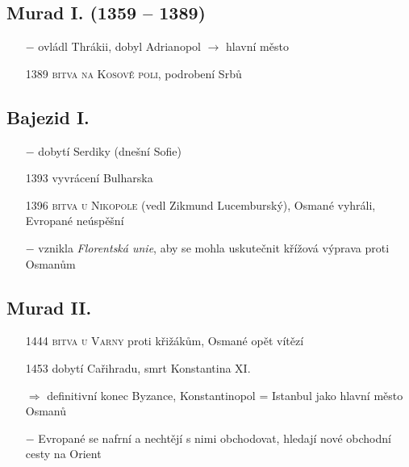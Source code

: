 \documentclass{article}
\begin{document}
\subsection*{Murad I. (1359 -- 1389)}
\begin{itemize}
    \vspace{-0.5em}
    \setlength\itemsep{0.15em}
    \item[$-$] ovládl Thrákii, dobyl Adrianopol $\rightarrow$ hlavní město
    \item[1389] \textsc{bitva na Kosově poli}, podrobení Srbů
\end{itemize}

\subsection*{Bajezid I.}
\begin{itemize}
    \vspace{-0.5em}
    \setlength\itemsep{0.15em}
    \item[$-$] dobytí Serdiky (dnešní Sofie)
    \item[1393] vyvrácení Bulharska
    \item[1396] \textsc{bitva u Nikopole} (vedl Zikmund Lucemburský), Osmané vyhráli, Evropané neúspěšní
    \item[$-$] vznikla \textit{Florentská unie}, aby se mohla uskutečnit křížová výprava proti Osmanům
\end{itemize}

\subsection*{Murad II.}
\begin{itemize}
    \vspace{-0.5em}
    \setlength\itemsep{0.15em}
    \item[1444] \textsc{bitva u Varny} proti křižákům, Osmané opět vítězí
\end{itemize}

\begin{itemize}
    \vspace{-0.5em}
    \setlength\itemsep{0.15em}
    \item[1453] dobytí Cařihradu, smrt Konstantina XI.
    \item[$\Rightarrow$] definitivní konec Byzance, Konstantinopol = Istanbul jako hlavní město Osmanů
    \item[$-$] Evropané se nafrní a nechtějí s nimi obchodovat, hledají nové obchodní cesty na Orient
\end{itemize}
\end{document}

